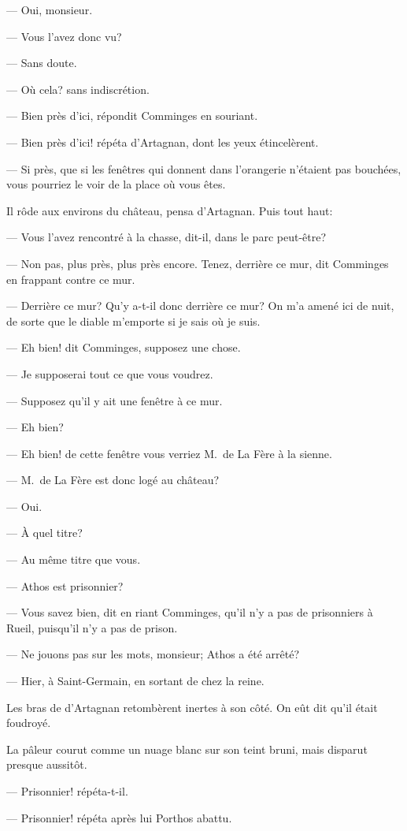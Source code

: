 — Oui, monsieur.

— Vous l'avez donc vu?

— Sans doute.

— Où cela? sans indiscrétion.

— Bien près d'ici, répondit Comminges en souriant.

— Bien près d'ici! répéta d'Artagnan, dont les yeux étincelèrent.

— Si près, que si les fenêtres qui donnent dans l'orangerie n'étaient pas bouchées, vous pourriez le voir de la place où vous êtes.

Il rôde aux environs du château, pensa d'Artagnan. Puis tout haut:

— Vous l'avez rencontré à la chasse, dit-il, dans le parc peut-être?

— Non pas, plus près, plus près encore. Tenez, derrière ce mur, dit Comminges en frappant contre ce mur.

— Derrière ce mur? Qu'y a-t-il donc derrière ce mur? On m'a amené ici de nuit, de sorte que le diable m'emporte si je sais où je suis.

— Eh bien! dit Comminges, supposez une chose.

— Je supposerai tout ce que vous voudrez.

— Supposez qu'il y ait une fenêtre à ce mur.

— Eh bien?

— Eh bien! de cette fenêtre vous verriez M.~de La Fère à la sienne.

— M.~de La Fère est donc logé au château?

— Oui.

— À quel titre?

— Au même titre que vous.

— Athos est prisonnier?

— Vous savez bien, dit en riant Comminges, qu'il n'y a pas de prisonniers à Rueil, puisqu'il n'y a pas de prison.

— Ne jouons pas sur les mots, monsieur; Athos a été arrêté?

— Hier, à Saint-Germain, en sortant de chez la reine.

Les bras de d'Artagnan retombèrent inertes à son côté. On eût dit qu'il était foudroyé.

La pâleur courut comme un nuage blanc sur son teint bruni, mais disparut presque aussitôt.

— Prisonnier! répéta-t-il.

— Prisonnier! répéta après lui Porthos abattu.

